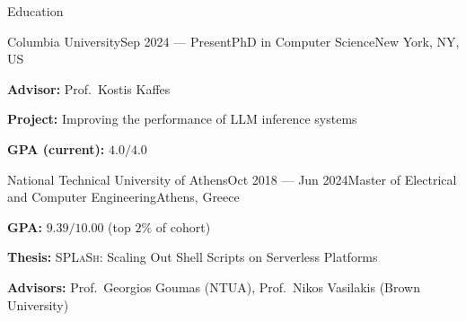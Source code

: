 \documentclass[letterpaper, 12pt]{resume}
\newcommand{\heading}[1]{\textbf{#1:}\xspace}
\begin{document}
\begin{rSection}{Education}
    \begin{rSubsection}{Columbia University}{Sep 2024 --- Present}{PhD in Computer Science}{New York, NY, US}
        \item \heading{Advisor} Prof.\ Kostis Kaffes
        \item \heading{Project} Improving the performance of LLM inference systems
        \item \heading{GPA (current)} \( 4.0 / 4.0 \)
    \end{rSubsection}

    \begin{rSubsection}{National Technical University of Athens}{Oct 2018 --- Jun 2024}{Master of Electrical and Computer Engineering}{Athens, Greece}
        \item \heading{GPA} \( 9.39 / 10.00 \) (top \( 2\% \) of cohort)
        \item \heading{Thesis} \textsc{SPLaSh}: Scaling Out Shell Scripts on Serverless Platforms
        \item \heading{Advisors} Prof.\ Georgios Goumas (NTUA), Prof.\ Nikos Vasilakis (Brown University)
    \end{rSubsection}
\end{rSection}
\end{document}

